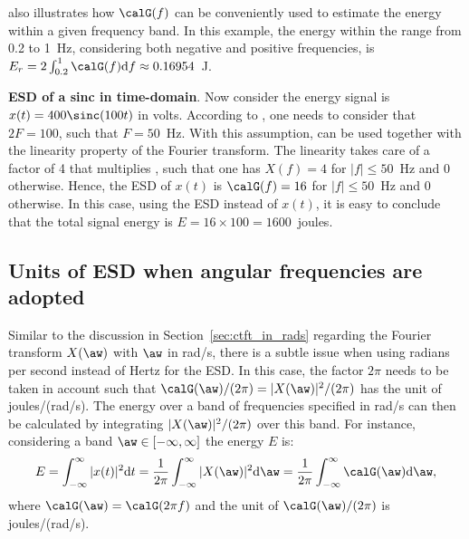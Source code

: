
 also illustrates how $\calG(f)$ can be conveniently used to estimate the energy within a given frequency band. In this example, the energy within the range from 0.2 to 1~Hz, considering both negative and positive frequencies, is
$E_r = 2 \int_{0.2}^{1} \calG(f) \textrm{d}f \approx 0.16954$~J.
\eExample 

\bExample \textbf{ESD of a sinc in time-domain}.
\label{ex:sinc-time}
Now consider the energy signal is $x(t)= 400 \sinc(100 t)$ in volts. According to , one
needs to consider that $2F=100$, such that $F=50$~Hz. With this assumption,  can be used together with
the linearity property of the Fourier transform. The linearity takes care of a factor of 4
that multiplies , such that one has $X(f) = 4$ for $|f| \le 50$~Hz and 0 otherwise.
Hence, the ESD of $x(t)$ is $\calG(f)=16$ for $|f| \le 50$~Hz and 0 otherwise. In this case, using the ESD instead of $x(t)$, it is easy to conclude that the total signal energy is $E = 16 \times 100 = 1600$~joules.
\eExample 

\subsection{{\akadvanced} Units of ESD when angular frequencies are adopted}
\label{sec:digital_Hz}

Similar to the discussion in Section~\ref{sec:ctft_in_rads} regarding the Fourier transform $X(\aw)$ with $\aw$ in rad/s,
there is a subtle issue when using radians per second instead of Hertz for the ESD. In this case, the factor
$2 \pi$ needs to be taken in account such that $\calG(\aw)/(2\pi)=|X(\aw)|^2/(2\pi)$ has the unit of joules/(rad/s).
The energy over a band of frequencies specified in rad/s can then be calculated by integrating $|X(\aw)|^2/(2\pi)$ over this
band. For instance, considering a band $\aw \in [-\infty, \infty]$ the energy $E$ is:
\begin{equation}
E = \int_{-\infty}^{\infty} |x(t)|^2 \textrm{d}t = \frac{1}{2 \pi}\int_{-\infty}^{\infty} |X(\aw)|^2 \textrm{d}\aw = \frac{1}{2 \pi}\int_{-\infty}^{\infty} \calG(\aw) \textrm{d}\aw,
\label{eq:parseval_ct_rads}
\end{equation}
where $\calG(\aw) = \calG(2\pi f)$ and the unit of $\calG(\aw)/(2\pi)$ is joules/(rad/s). 

